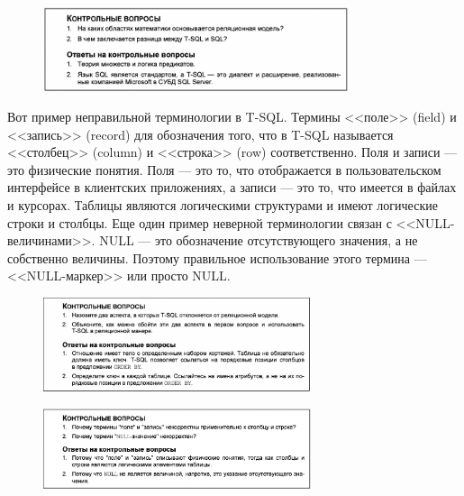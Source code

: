 \begin{figure}[h!]
	\begin{center}
		\includegraphics[width=0.8\textwidth]{img/control1.png}
	\end{center}
	\captionsetup{justification=centering}
\end{figure}


Вот пример неправильной терминологии в T-SQL. Термины <<поле>> (field) и <<запись>> (record) для обозначения того, что в T-SQL называется <<столбец>> (column) и
<<строка>> (row) соответственно. Поля и записи — это физические понятия. Поля —
это то, что отображается в пользовательском интерфейсе в клиентских приложениях, а записи — это то, что имеется в файлах и курсорах. Таблицы являются логическими структурами и имеют логические строки и столбцы.
Еще один пример неверной терминологии связан с <<NULL-величинами>>. NULL — это
обозначение отсутствующего значения, а не собственно величины. Поэтому правильное использование этого термина — <<NULL-маркер>> или просто NULL. 

\begin{figure}[h!]
	\begin{center}
		\includegraphics[width=0.7\textwidth]{img/control2.png}
	\end{center}
	\captionsetup{justification=centering}
\end{figure}

\begin{figure}[h!]
	\begin{center}
		\includegraphics[width=0.7\textwidth]{img/control3.png}
	\end{center}
	\captionsetup{justification=centering}
\end{figure}


